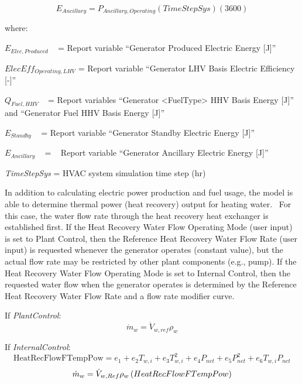 \begin{equation}
{E_{Ancillary}} = {P_{Ancillary,Operating}}\left( {TimeStepSys} \right)\left( {3600} \right)
\end{equation}

where:

\({E_{Elec,Produced}}\) ~ = Report variable ``Generator Produced Electric Energy {[}J{]}''

\(ElecEf{f_{Operating,LHV}}\) = Report variable ``Generator LHV Basis Electric Efficiency {[}-{]}''

\({Q_{Fuel,HHV}}\) ~ = Report variables ``Generator \textless{}FuelType\textgreater{} HHV Basis Energy {[}J{]}'' and ``Generator Fuel HHV Basis Energy {[}J{]}''

\({E_{Standby}}\) ~ = Report variable ``Generator Standby Electric Energy {[}J{]}''

\({E_{Ancillary}}\) ~ = ~ Report variable ``Generator Ancillary Electric Energy {[}J{]}''

\emph{TimeStepSys} = HVAC system simulation time step (hr)

In addition to calculating electric power production and fuel usage, the model is able to determine thermal power (heat recovery) output for heating water.~ For this case, the water flow rate through the heat recovery heat exchanger is established first. If the Heat Recovery Water Flow Operating Mode (user input) is set to Plant Control, then the Reference Heat Recovery Water Flow Rate (user input) is requested whenever the generator operates (constant value), but the actual flow rate may be restricted by other plant components (e.g., pump). If the Heat Recovery Water Flow Operating Mode is set to Internal Control, then the requested water flow when the generator operates is determined by the Reference Heat Recovery Water Flow Rate and a flow rate modifier curve.

If \emph{PlantControl}:
\begin{equation}
  \dot{m}_w = \dot{V}_{w,ref}\rho_w
\end{equation}

If \emph{InternalControl}:
\begin{equation}
  \text{HeatRecFlowFTempPow} = e_1 + e_2 T_{w,i} + e_3 T_{w,i}^2 + e_4 P_{net} + e_5 P_{net}^2 + e_6 T_{w,i} P_{net}
\end{equation}
\begin{equation}
  \dot{m}_w = \dot{V}_{w,Ref} \rho_w \left(HeatRecFlowFTempPow\right)
\end{equation}

